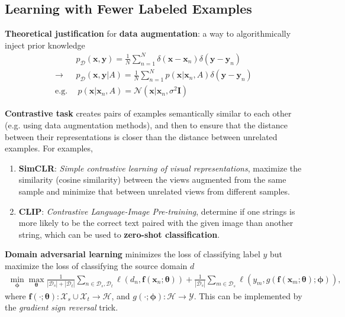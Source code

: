 \subsection{Learning with Fewer Labeled Examples}

\textbf{Theoretical justification} for \textbf{data augmentation}: a way to algorithmically inject prior knowledge
\begin{align}
    &~p_\mathcal{D}(\bm{x},\bm{y}) = \frac{1}{N}\sum_{n=1}^N\delta(\bm{x}-\bm{x}_n)\delta(\bm{y}-\bm{y}_n)\\
    \to
    &~p_\mathcal{D}(\bm{x},\bm{y}|A) = \frac{1}{N}\sum_{n=1}^N p(\bm{x}|\bm{x}_n,A)\delta(\bm{y}-\bm{y}_n)\\
    \text{e.g.}&~~p(\bm{x}|\bm{x}_n,A)=\mathcal{N}(\bm{x}|\bm{x}_n,\sigma^2\mathbf{I})
\end{align}


 \textbf{Contrastive task} creates pairs of examples semantically similar to each other (e.g. using data augmentation methods),
 and then to ensure that the distance between their representations is closer than the distance between unrelated examples. 
 For examples,
\begin{enumerate}[(1)]
    \item \textbf{SimCLR}: \textit{Simple contrastive learning of visual representations},
    maximize the similarity (cosine similarity) between the views augmented from the same sample and minimize that between unrelated views from different samples.
    \item \textbf{CLIP}: \textit{Contrastive Language-Image Pre-training}, determine if one strings is more likely to be the correct text paired with the given image than another string,
    which can be used to \textbf{zero-shot classification}.
\end{enumerate}

\textbf{Domain adversarial learning} minimizes the loss of classifying label $y$ but maximize the loss of classifying the source domain $d$
{\small\begin{gather}
    \min_{\bm{\phi}}\max_{\bm{\theta}} \frac{1}{|\mathcal{D}_s|+|\mathcal{D}_t|} \sum_{n\in\mathcal{D}_s,\mathcal{D}_t}
    \ell(d_n,\bm{f}(\bm{x}_n;\bm{\theta})) + \frac{1}{|\mathcal{D}_s|}\sum_{m\in\mathcal{D}_s}\ell(y_m,g(\bm{f}(\bm{x}_m;\bm{\theta});\bm{\phi})),
\end{gather}}
where $\bm{f}(\cdot;\bm{\theta}):\mathcal{X}_s\cup\mathcal{X}_t\to\mathcal{H}$, and $g(\cdot;\bm{\phi}):\mathcal{H}\to\mathcal{Y}$.
This can be implemented by the \textit{gradient sign reversal} trick.


